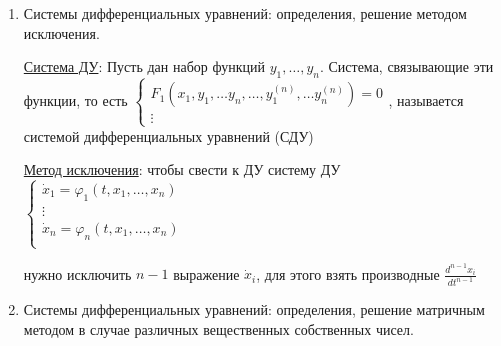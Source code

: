 \documentclass[12pt]{article}
\begin{document}
\begin{enumerate}
\begin{enumerate}
            \item Поиск частного решения в виде $y^*(x) = C_1(x)y_1(x) + C_2(x)y_2(x)$, где функции $C_1(x), C_2(x)$ заменяют константы из общего решения однородного уравнения

            \item Решение системы для производных $C_1^\prime(x), C_2^\prime(x)$:
            
            $\begin{cases} 
            C_1^\primey_1 + C_2^\primey_2 = 0 \\
            C_1^\primey_1^\prime + C_2^\primey_2^\prime = f(x)
            \end{cases}$
            
            с использованием вронскиана $W = y_1y_2^\prime - y_2y_1^\prime$
            \item Интегрирование выражений: 
            
            $C_1(x) = \int -\frac{y_2 f}{W}dx, \quad C_2(x) = \int \frac{y_1 f}{W}dx$
        \end{enumerate}


        \item Системы дифференциальных уравнений: определения, решение методом исключения.

        \hyperlink{desystem}{Система ДУ}: \Defs Пусть дан набор функций $y_1, \dots, y_n$. Система, связывающие эти функции, то есть
        $\begin{cases}
             F_1(x_1, y_1, \dots y_n, \dots, y_1^{(n)}, \dots y_n^{(n)}) = 0 \\
             \vdots
        \end{cases}$, называется системой дифференциальных уравнений (СДУ)

        \hyperlink{exceptionmethod}{Метод исключения}: чтобы свести к ДУ систему ДУ $\begin{cases}
            \dot x_1 = \varphi_1(t, x_1, \dots, x_n) \\
            \vdots \\
            \dot x_n = \varphi_n(t, x_1, \dots, x_n) \\
       \end{cases}$ 
       
       нужно исключить $n - 1$ выражение $\dot x_i$, для этого взять производные $\frac{d^{n - 1} x_i}{dt^{n - 1}}$

        \item Системы дифференциальных уравнений: определения, решение матричным методом в случае различных вещественных собственных чисел.


\end{enumerate}
\end{document}
